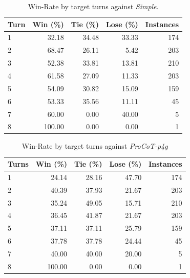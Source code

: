 \begin{table}[t]
    \footnotesize
    \centering
    \begin{tabular}{l rrrr}
        \toprule
        \textbf{Turn} & \textbf{Win (\%)} & \textbf{Tie (\%)} & \textbf{Lose (\%)} & \textbf{Instances} \\
        \midrule
        1 & 32.18 & 34.48 & 33.33 & 174 \\ 
        2 & 68.47 & 26.11 & 5.42 & 203 \\ 
        3 & 52.38 & 33.81 & 13.81 & 210 \\ 
        4 & 61.58 & 27.09 & 11.33 & 203 \\ 
        5 & 54.09 & 30.82 & 15.09 & 159 \\ 
        6 & 53.33 & 35.56 & 11.11 & 45 \\ 
        7 & 60.00 & 0.00 & 40.00 & 5 \\ 
        8 & 100.00 & 0.00 & 0.00 & 1 \\ 
        \bottomrule
    \end{tabular}
    \caption{Win-Rate by target turns against \textit{Simple}.}
    \label{tab:result-daily-persuasion-per-history-turns-simple}
\end{table}

\begin{table}[t]
    \footnotesize
    \centering
    \begin{tabular}{l rrrr}
        \toprule
        \textbf{Turns} & \textbf{Win (\%)} & \textbf{Tie (\%)} & \textbf{Lose (\%)} & \textbf{Instances} \\
        \midrule
        1 & 24.14 & 28.16 & 47.70 & 174 \\ 
        2 & 40.39 & 37.93 & 21.67 & 203 \\ 
        3 & 35.24 & 49.05 & 15.71 & 210 \\ 
        4 & 36.45 & 41.87 & 21.67 & 203 \\ 
        5 & 37.11 & 37.11 & 25.79 & 159 \\ 
        6 & 37.78 & 37.78 & 24.44 & 45 \\ 
        7 & 40.00 & 40.00 & 20.00 & 5 \\ 
        8 & 100.00 & 0.00 & 0.00 & 1 \\ 
        \bottomrule
    \end{tabular}
    \caption{Win-Rate by target turns against \textit{ProCoT-p4g}}
    \label{tab:result-daily-persuasion-per-history-turns-p4g}
\end{table}
